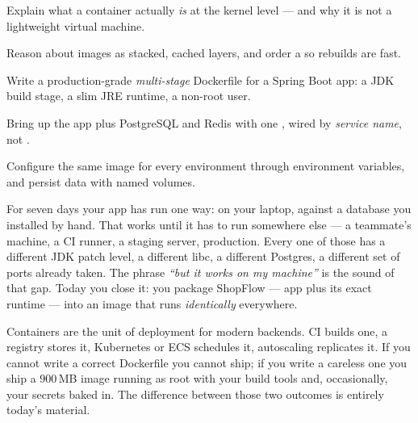 
\begin{objectives}
\begin{wbitem}
  \item Explain what a container actually \emph{is} at the kernel level --- and why it is not a lightweight virtual machine.
  \item Reason about images as stacked, cached layers, and order a  so rebuilds are fast.
  \item Write a production-grade \emph{multi-stage} Dockerfile for a Spring Boot app: a JDK build stage, a slim JRE runtime, a non-root user.
  \item Bring up the app plus PostgreSQL and Redis with one , wired by \emph{service name}, not .
  \item Configure the same image for every environment through environment variables, and persist data with named volumes.
\end{wbitem}
\end{objectives}


 For seven days your app has run one way:  on your laptop, against a database you installed by hand. That works until it has to run somewhere else --- a teammate's machine, a CI runner, a staging server, production. Every one of those has a different JDK patch level, a different libc, a different Postgres, a different set of ports already taken. The phrase \emph{``but it works on my machine''} is the sound of that gap. Today you close it: you package ShopFlow --- app plus its exact runtime --- into an image that runs \emph{identically} everywhere.

 Containers are the unit of deployment for modern backends. CI builds one, a registry stores it, Kubernetes or ECS schedules it, autoscaling replicates it. If you cannot write a correct Dockerfile you cannot ship; if you write a careless one you ship a 900\,MB image running as root with your build tools and, occasionally, your secrets baked in. The difference between those two outcomes is entirely today's material.

